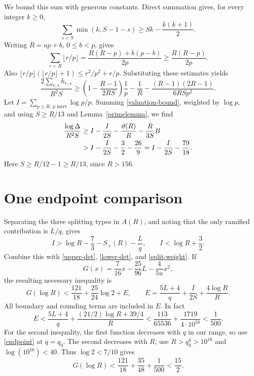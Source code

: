 \documentclass[11pt]{article}
\begin{document}
We bound this sum with generous constants. Direct summation gives,
for every integer \(k\ge0\),
\[
 \sum_{s<S}\min(k,S-1-s)\ge Sk-\frac{k(k+1)}2.
\]
Writing \(R=ap+b\), \(0\le b<p\), gives
\[
 \sum_{r<R}\lfloor r/p\rfloor
 =\frac{R(R-p)+b(p-b)}{2p}\ge\frac{R(R-p)}{2p}.
\]
Also \(\lfloor r/p\rfloor(\lfloor r/p\rfloor+1)
\le r^2/p^2+r/p\). Substituting these estimates yields
\begin{equation}\label{valuation-bound}
 \frac{2\sum_{r,s}h_{r,s}}{R^2S}
 \ge\left(1-\frac{R-1}{2RS}\right)\frac1p-\frac1R
                  -\frac{(R-1)(2R-1)}{6RS p^2}.
\end{equation}
Let \(I=\sum_{p\le R,\ p\text{ inert}}\log p/p\). Summing
\eqref{valuation-bound}, weighted by \(\log p\), and using
\(S\ge R/13\) and Lemma~\ref{primelemma}, we find
\begin{align}
 \frac{\log\Delta}{R^2S}
 &\ge I-\frac{I}{2S}-\frac{\vartheta(R)}R-\frac{R}{3S}B\notag\\
 &>I-\frac{I}{2S}-\frac32-\frac{26}{9}
  =I-\frac{I}{2S}-\frac{79}{18}.\label{lower-det}
\end{align}
Here \(S\ge R/12-1\ge R/13\), since \(R>156\).

\section{One endpoint comparison}

Separating the three splitting types in \(A(R)\), and noting that
the only ramified contribution is \(L/q\), gives
\[
 I>\log R-\frac73-S_+(R)-\frac Lq,
 \qquad I<\log R+\frac32.
\]
Combine this with \eqref{upper-det}, \eqref{lower-det}, and
\eqref{split-weight}. If
\[
 G(x)=\frac7{16}x-\frac{25}{96}L-\frac4{5u}x^2,
\]
the resulting necessary inequality is
\begin{equation}\label{G-upper}
 G(\log R)<\frac{121}{18}+\frac{25}{24}\log2+E,
 \qquad
 E=\frac{5L+4}q+\frac{I}{2S}+\frac{4\log R}{R}.
\end{equation}
All boundary and rounding terms are included in \(E\). In fact
\begin{equation}\label{error-bound}
 E<\frac{5L+4}q+\frac{(21/2)\log R+39/4}{R}
 <\frac{113}{65536}+\frac{1719}{4\cdot10^{16}}<\frac1{500}.
\end{equation}
For the second inequality, the first function decreases with \(q\)
in our range, so use \eqref{endpoint} at \(q=q_0\).
The second decreases with \(R\); use \(R>q_0^4>10^{16}\) and
\(\log(10^{16})<40\). Thus \(\log2<7/10\) gives
\begin{equation}\label{G-simple}
 G(\log R)<\frac{121}{18}+\frac{35}{48}+\frac1{500}
 <\frac{15}{2}.
\end{equation}
\end{document}
